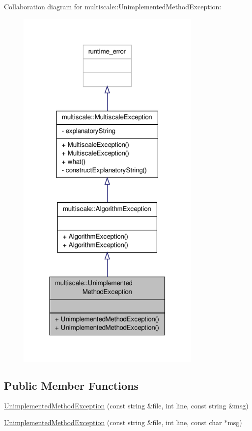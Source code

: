 Collaboration diagram for multiscale\-:\-:Unimplemented\-Method\-Exception\-:
\nopagebreak
\begin{figure}[H]
\begin{center}
\leavevmode
\includegraphics[width=256pt]{classmultiscale_1_1UnimplementedMethodException__coll__graph}
\end{center}
\end{figure}
\subsection*{Public Member Functions}
\begin{DoxyCompactItemize}
\item 
\hyperlink{classmultiscale_1_1UnimplementedMethodException_af3e41ba96ee1376dece07e2f875cbc11}{Unimplemented\-Method\-Exception} (const string \&file, int line, const string \&msg)
\item 
\hyperlink{classmultiscale_1_1UnimplementedMethodException_aff17b782e719904081a27badd18740b2}{Unimplemented\-Method\-Exception} (const string \&file, int line, const char $\ast$msg)
\end{DoxyCompactItemize}


